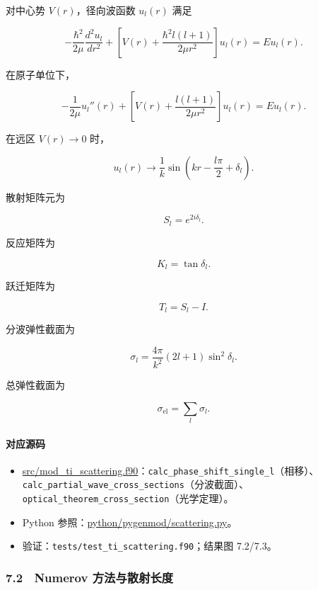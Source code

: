 \documentclass[
]{ctexbook}
\providecommand{\tightlist}{%
  \setlength{\itemsep}{0pt}\setlength{\parskip}{0pt}}
\begin{document}
对中心势 \(V(r)\)，径向波函数 \(u_l(r)\) 满足

\[
-\frac{\hbar^2}{2\mu}
\frac{d^2u_l}{dr^2}
+
\left[
V(r)
+
\frac{\hbar^2l(l+1)}{2\mu r^2}
\right]u_l(r)
=
Eu_l(r).
\]

在原子单位下，

\[
-\frac{1}{2\mu}u_l''(r)
+
\left[
V(r)
+
\frac{l(l+1)}{2\mu r^2}
\right]u_l(r)
=
Eu_l(r).
\]

在远区 \(V(r)\rightarrow0\) 时，

\[
u_l(r)
\rightarrow
\frac{1}{k}
\sin\left(kr-\frac{l\pi}{2}+\delta_l\right).
\]

散射矩阵元为

\[
S_l=e^{2i\delta_l}.
\]

反应矩阵为

\[
K_l=\tan\delta_l.
\]

跃迁矩阵为

\[
T_l=S_l-I.
\]

分波弹性截面为

\[
\sigma_l
=
\frac{4\pi}{k^2}(2l+1)\sin^2\delta_l.
\]

总弹性截面为

\[
\sigma_{\mathrm{el}}
=
\sum_l\sigma_l.
\]

\hypertarget{ux5bf9ux5e94ux6e90ux7801-25}{%
\paragraph{对应源码}\label{ux5bf9ux5e94ux6e90ux7801-25}}

\begin{itemize}
\tightlist
\item
  \href{https://github.com/l1Ha/QuantumGeneralModule/blob/main/src/mod_ti_scattering.f90}{src/mod\_ti\_scattering.f90}：\texttt{calc\_phase\_shift\_single\_l}（相移）、\texttt{calc\_partial\_wave\_cross\_sections}（分波截面）、\texttt{optical\_theorem\_cross\_section}（光学定理）。
\item
  Python
  参照：\href{https://github.com/l1Ha/QuantumGeneralModule/blob/main/python/pygenmod/scattering.py}{python/pygenmod/scattering.py}。
\item
  验证：\texttt{tests/test\_ti\_scattering.f90}；结果图 7.2/7.3。
\end{itemize}

\hypertarget{numerov-ux65b9ux6cd5ux4e0eux6563ux5c04ux957fux5ea6}{%
\subsubsection{7.2　Numerov
方法与散射长度}\label{numerov-ux65b9ux6cd5ux4e0eux6563ux5c04ux957fux5ea6}}
\end{document}
